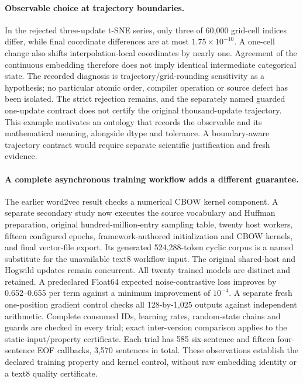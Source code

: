 \paragraph{Observable choice at trajectory boundaries.}
In the rejected three-update t-SNE series, only three of 60,000 grid-cell indices differ, while final coordinate differences are at most $1.75\times10^{-10}$. A one-cell change also shifts interpolation-local coordinates by nearly one. Agreement of the continuous embedding therefore does not imply identical intermediate categorical state. The recorded diagnosis is trajectory/grid-rounding sensitivity as a hypothesis; no particular atomic order, compiler operation or source defect has been isolated. The strict rejection remains, and the separately named guarded one-update contract does not certify the original thousand-update trajectory. This example motivates an ontology that records the observable and its mathematical meaning, alongside dtype and tolerance. A boundary-aware trajectory contract would require separate scientific justification and fresh evidence.

\paragraph{A complete asynchronous training workflow adds a different guarantee.}
The earlier word2vec result checks a numerical CBOW kernel component. A separate secondary study now executes the source vocabulary and Huffman preparation, original hundred-million-entry sampling table, twenty host workers, fifteen configured epochs, framework-authored initialization and CBOW kernels, and final vector-file export. Its generated 524,288-token cyclic corpus is a named substitute for the unavailable text8 workflow input. The original shared-host and Hogwild updates remain concurrent. All twenty trained models are distinct and retained. A predeclared Float64 expected noise-contrastive loss improves by 0.652--0.655 per term against a minimum improvement of $10^{-4}$. A separate fresh one-position gradient control checks all 128-by-1,025 outputs against independent arithmetic. Complete consumed IDs, learning rates, random-state chains and guards are checked in every trial; exact inter-version comparison applies to the static-input/property certificate. Each trial has 585 six-sentence and fifteen four-sentence EOF callbacks, 3,570 sentences in total. These observations establish the declared training property and kernel control, without raw embedding identity or a text8 quality certificate.

